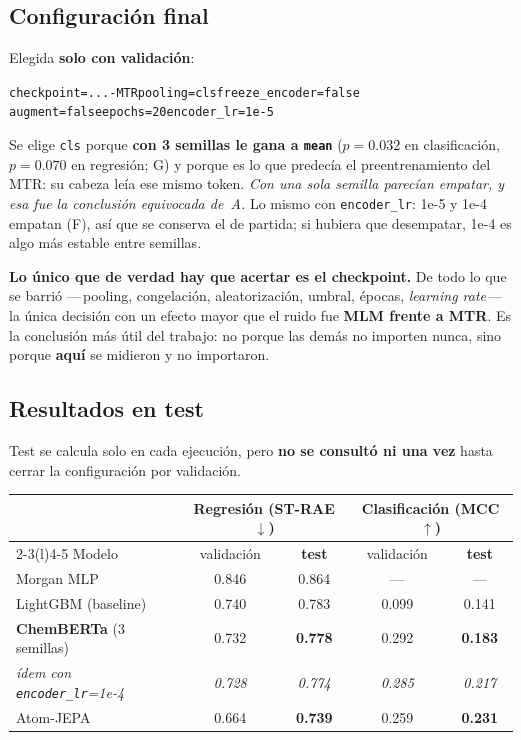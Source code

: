 \documentclass[11pt,a4paper]{article}
\newcommand{\var}[1]{\texttt{#1}}
\begin{document}
\subsection*{Configuración final}
Elegida \textbf{solo con validación}:
\begin{center}
\var{checkpoint=...-MTR}\quad \var{pooling=cls}\quad \var{freeze\_encoder=false}\quad
\var{augment=false}\quad \var{epochs=20}\quad \var{encoder\_lr=1e-5}
\end{center}
Se elige \var{cls} porque \textbf{con 3 semillas le gana a \var{mean}} ($p=0.032$ en clasificación,
$p=0.070$ en regresión; G) y porque es lo que predecía el preentrenamiento del MTR: su cabeza leía ese
mismo token. \emph{Con una sola semilla parecían empatar, y esa fue la conclusión equivocada de~A.} Lo mismo con \var{encoder\_lr}: 1e-5 y 1e-4
empatan (F), así que se conserva el de partida; si hubiera que desempatar, 1e-4 es algo más estable
entre semillas.

\medskip
\noindent\textbf{Lo único que de verdad hay que acertar es el checkpoint.} De todo lo que se barrió
---\,pooling, congelación, aleatorización, umbral, épocas, \emph{learning rate}\,--- la única decisión
con un efecto mayor que el ruido fue \textbf{MLM frente a MTR}. Es la conclusión más útil del trabajo:
no porque las demás no importen nunca, sino porque \textbf{aquí} se midieron y no importaron.

\subsection*{Resultados en test}
Test se calcula solo en cada ejecución, pero \textbf{no se consultó ni una vez} hasta cerrar la
configuración por validación.

\begin{center}
\begin{tabular}{lcccc}
\toprule
& \multicolumn{2}{c}{Regresión (ST-RAE$\downarrow$)} & \multicolumn{2}{c}{Clasificación (MCC$\uparrow$)} \\
\cmidrule(r){2-3}\cmidrule(l){4-5}
Modelo & validación & \textbf{test} & validación & \textbf{test} \\ \midrule
Morgan MLP & 0.846 & 0.864 & --- & --- \\
LightGBM (baseline) & 0.740 & 0.783 & 0.099 & 0.141 \\
\textbf{ChemBERTa} (3 semillas) & 0.732 & \textbf{0.778} & 0.292 & \textbf{0.183} \\
\quad\emph{ídem con \var{encoder\_lr}=1e-4} & \emph{0.728} & \emph{0.774} & \emph{0.285} & \emph{0.217} \\
Atom-JEPA & 0.664 & \textbf{0.739} & 0.259 & \textbf{0.231} \\
\bottomrule
\end{tabular}
\end{center}
\end{document}
